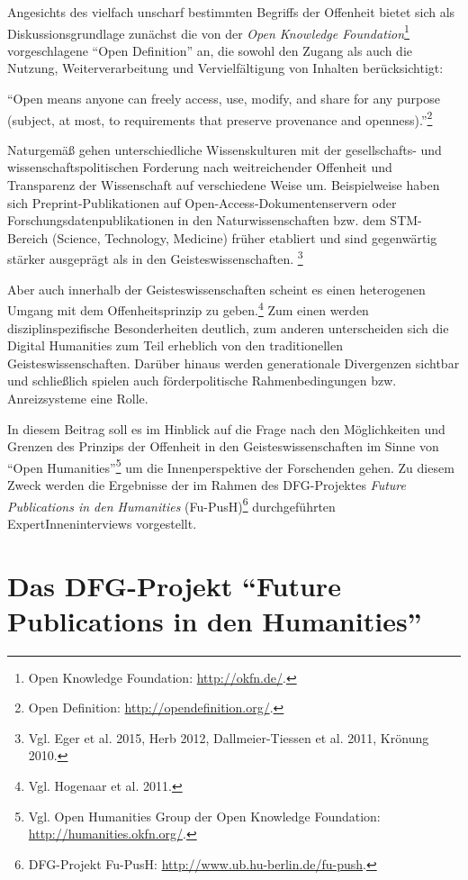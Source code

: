 \documentclass[a4paper,
fontsize=11pt,
oneside,
numbers=noperiodatend,
parskip=half-,
bibliography=totoc,
final
]{scrartcl}
\begin{document}
Angesichts des vielfach unscharf bestimmten Begriffs der Offenheit
bietet sich als Diskussionsgrundlage zunächst die von der \emph{Open
Knowledge Foundation}\footnote{Open Knowledge Foundation:
  \url{http://okfn.de/}.} vorgeschlagene \enquote{Open Definition} an,
die sowohl den Zugang als auch die Nutzung, Weiterverarbeitung und
Vervielfältigung von Inhalten berücksichtigt:

\enquote{Open means anyone can freely access, use, modify, and share for
any purpose (subject, at most, to requirements that preserve provenance
and openness).}\footnote{Open Definition:
  \url{http://opendefinition.org/}.}

Naturgemäß gehen unterschiedliche Wissenskulturen mit der gesellschafts-
und wissenschaftspolitischen Forderung nach weitreichender Offenheit und
Transparenz der Wissenschaft auf verschiedene Weise um. Beispielweise
haben sich Preprint-Publikationen auf Open-Access-Doku\-mentenservern oder
Forschungsdatenpublikationen in den Naturwissenschaften bzw. dem
STM-Bereich (Science, Technology, Medicine) früher etabliert und sind
gegenwärtig stärker ausgeprägt als in den Geisteswissenschaften.
\footnote{Vgl. Eger et al. 2015, Herb 2012, Dallmeier-Tiessen et al.
  2011, Krönung 2010.}

Aber auch innerhalb der Geisteswissenschaften scheint es einen
heterogenen Umgang mit dem Offenheitsprinzip zu geben.\footnote{Vgl.
  Hogenaar et al. 2011.} Zum einen werden disziplinspezifische
Besonderheiten deutlich, zum anderen unterscheiden sich die Digital
Humanities zum Teil erheblich von den traditionellen
Geisteswissenschaften. Darüber hinaus werden generationale Divergenzen
sichtbar und schließlich spielen auch förderpolitische Rahmenbedingungen
bzw. Anreizsysteme eine Rolle.

In diesem Beitrag soll es im Hinblick auf die Frage nach den
Möglichkeiten und Grenzen des Prinzips der Offenheit in den
Geisteswissenschaften im Sinne von \enquote{Open Humanities}\footnote{Vgl.
  Open Humanities Group der Open Knowledge Foundation:
  \url{http://humanities.okfn.org/}.} um die Innenperspektive der
Forschenden gehen. Zu diesem Zweck werden die Ergebnisse der im Rahmen
des DFG-Projektes \emph{Future Publications in den Humanities}
(Fu-PusH)\footnote{DFG-Projekt Fu-PusH:
  \url{http://www.ub.hu-berlin.de/fu-push}.} durchgeführten
ExpertInneninterviews vorgestellt.

\section{\texorpdfstring{Das DFG-Projekt \enquote{Future Publications in
den
Humanities}}{Das DFG-Projekt Future Publications in den Humanities}}\label{das-dfg-projekt-future-publications-in-den-humanities}
\end{document}
